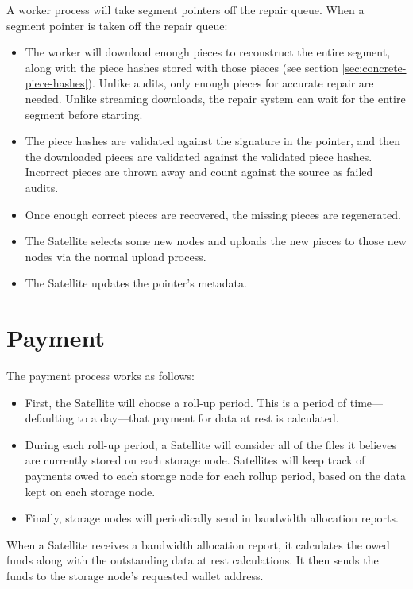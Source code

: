\documentclass[8pt,fleqn,openany]{book}
\begin{document}
A worker process will take segment pointers off the repair queue.
When a segment pointer is taken off the repair queue:

\begin{itemize}
\item The worker will download enough pieces to reconstruct the entire segment,
  along with the piece hashes stored with those pieces
  (see section \ref{sec:concrete-piece-hashes}).
  Unlike audits, only enough pieces for accurate repair are needed.
  Unlike streaming downloads, the repair system can wait for the entire segment
  before starting.
\item The piece hashes are validated against the signature in the pointer, and
  then the downloaded pieces are validated against the validated piece hashes.
  Incorrect pieces are thrown away and count against the source as failed audits.
\item Once enough correct pieces are recovered, the missing pieces are
  regenerated.
\item The Satellite selects some new nodes and uploads the new pieces to
  those new nodes via the normal upload process.
\item The Satellite updates the pointer's metadata.
\end{itemize}

\section{Payment}

The payment process works as follows:

\begin{itemize}
\item First, the Satellite will choose a roll-up period. This is a period of
  time---defaulting to a day---that payment for data at rest is calculated.
\item During each roll-up period, a Satellite will consider all of the files it
  believes are currently stored on each storage node. Satellites will keep track
of payments owed to each storage node for each rollup period, based on
the data kept on each storage node.
\item Finally, storage nodes will periodically send in bandwidth allocation reports.
\end{itemize}

When a
  Satellite receives a bandwidth allocation report, it calculates the owed
  funds along with the outstanding data at rest calculations. It then sends the
  funds to the storage node's requested wallet address.
\end{document}
